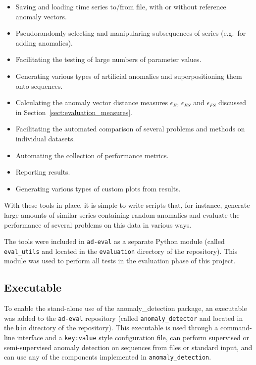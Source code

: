 \begin{itemize}
    \item Saving and loading time series to/from file, with or without reference anomaly vectors.
    \item Pseudorandomly selecting and manipularing subsequences of series (e.g.\ for adding anomalies).
    \item Facilitating the testing of large numbers of parameter values.
    \item Generating various types of artificial anomalies and superpositioning them onto sequences.
    \item Calculating the anomaly vector distance measures $\epsilon_E$, $\epsilon_{ES}$ and $\epsilon_{FS}$ discussed in Section~\ref{sect:evaluation_measures}.
    \item Facilitating the automated comparison of several problems and methods on individual datasets.
    \item Automating the collection of performance metrics.
    \item Reporting results.
    \item Generating various types of custom plots from results.
\end{itemize}

With these tools in place, it is simple to write scripts that, for instance, generate large amounts of similar series containing random anomalies and evaluate the performance of several problems on this data in various ways. 

The tools were included in \texttt{ad-eval} as a separate Python module (called \texttt{eval\_utils} and located in the \texttt{evaluation} directory of the repository). This module was used to perform all tests in the evaluation phase of this project.

\subsection{Executable}
\label{sect:executable}

To enable the stand-alone use of the anomaly\_detection package, an executable was added to the \texttt{ad-eval} repository (called \texttt{anomaly\_detector} and located in the \texttt{bin} directory of the repository). This executable is used through a command-line interface and a \texttt{key:value} style configuration file, can perform supervised or semi-supervised anomaly detection on sequences from files or standard input, and can use any of the components implemented in \texttt{anomaly\_detection}.


